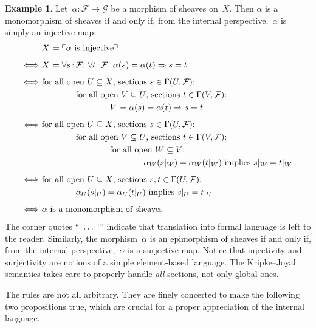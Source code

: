 \documentclass[10pt,reqno,a4paper]{amsbook}
\theoremstyle{definition}
\newtheorem{ex}[defn]{Example}
\theoremstyle{plain}
\theoremstyle{remark}
\newcommand{\F}{\mathcal{F}}
\newcommand{\G}{\mathcal{G}}
\newcommand{\?}{\,{:}\,}
\renewcommand{\_}{\mathpunct{.}\,}
\newcommand{\speak}[1]{\ulcorner\text{\textnormal{#1}}\urcorner}
\begin{document}
\begin{ex}\label{ex:injective-surjective}
Let~$\alpha : \F \to \G$ be a morphism of sheaves on~$X$. Then
$\alpha$ is a monomorphism of sheaves if and only if, from the internal
perspective,~$\alpha$ is simply an injective map:
\allowdisplaybreaks
\begin{align*}
  & X \models \speak{$\alpha$ is injective} \\[0.5em]
  \Longleftrightarrow\
  & X \models \forall s\?\F\_ \forall t\?\F\_ \alpha(s) = \alpha(t) \Rightarrow s = t \\[0.5em]
  \Longleftrightarrow\ &
    \text{for all open~$U \subseteq X$, sections $s \in \Gamma(U, \F)$:} \\
  &\qquad\qquad \text{for all open~$V \subseteq U$, sections $t \in \Gamma(V, \F)$:} \\
  &\qquad\qquad\qquad\qquad
      V \models \alpha(s) = \alpha(t) \Rightarrow s = t \\[0.5em]
  \Longleftrightarrow\ &
    \text{for all open~$U \subseteq X$, sections $s \in \Gamma(U, \F)$:} \\
  &\qquad\qquad \text{for all open~$V \subseteq U$, sections $t \in \Gamma(V, \F)$:} \\
  &\qquad\qquad\qquad\qquad
      \text{for all open~$W \subseteq V$:} \\
  &\qquad\qquad\qquad\qquad\qquad\qquad
        \text{$\alpha_W(s|_W) = \alpha_W(t|_W)$ implies $s|_W = t|_W$} \\[0.5em]
  \Longleftrightarrow\ &
    \text{for all open~$U \subseteq X$, sections $s, t \in \Gamma(U, \F)$:} \\
  &\qquad\qquad
        \text{$\alpha_U(s|_U) = \alpha_U(t|_U)$ implies $s|_U = t|_U$} \\[0.5em]
  \Longleftrightarrow\ &
    \text{$\alpha$ is a monomorphism of sheaves}
\end{align*}
The corner quotes ``$\speak{\ldots}$'' indicate that translation into formal
language is left to the reader. Similarly, the morphism~$\alpha$ is an epimorphism of
sheaves if and only if, from the internal perspective,~$\alpha$ is a
surjective map. Notice that injectivity and surjectivity are
notions of a simple element-based language. The Kripke--Joyal semantics
takes care to properly handle \emph{all} sections, not only global ones.
\end{ex}

The rules are not all arbitrary. They are finely concerted to make the
following two propositions true, which are crucial for a proper appreciation of the
internal language.
\end{document}
